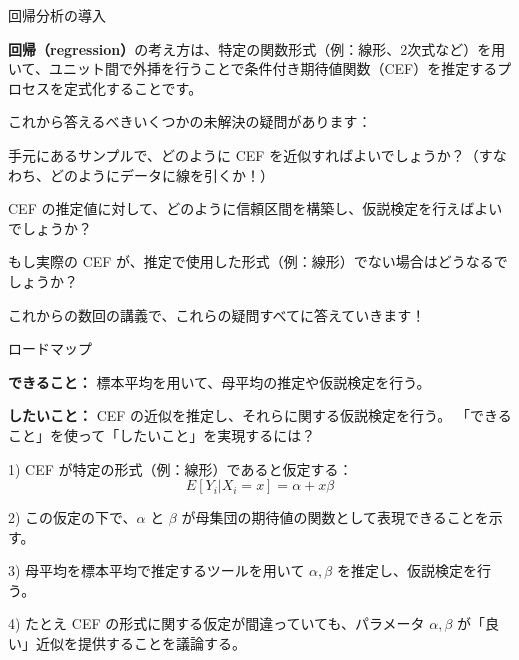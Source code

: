 \documentclass[11pt,handout]{beamer}
\newenvironment{wideitemize}{\itemize\addtolength{\itemsep}{10pt}}{\enditemize}
\begin{document}
\begin{frame}{回帰分析の導入}
\begin{wideitemize}

\item
\textbf{回帰（regression）}の考え方は、特定の関数形式（例：線形、2次式など）を用いて、ユニット間で外挿を行うことで条件付き期待値関数（CEF）を推定するプロセスを定式化することです。

\pause
\item
これから答えるべきいくつかの未解決の疑問があります：

\pause
\item
手元にあるサンプルで、どのように CEF を近似すればよいでしょうか？（すなわち、どのようにデータに線を引くか！）

\pause
\item
CEF の推定値に対して、どのように信頼区間を構築し、仮説検定を行えばよいでしょうか？

\pause
\item
もし実際の CEF が、推定で使用した形式（例：線形）でない場合はどうなるでしょうか？

\pause
\item
これからの数回の講義で、これらの疑問すべてに答えていきます！

\end{wideitemize}	
\end{frame}	


\begin{frame}{ロードマップ}
\vspace{0.2cm}
\begin{wideitemize}
\item \textbf{できること：} 標本平均を用いて、母平均の推定や仮説検定を行う。
\item \textbf{したいこと：} CEF の近似を推定し、それらに関する仮説検定を行う。
\end{wideitemize}
\pause
\bigskip
「できること」を使って「したいこと」を実現するには？
\pause
\begin{wideitemize}
	\item 1) CEF が特定の形式（例：線形）であると仮定する：
	$$E[Y_i | X_i = x] = \alpha + x \beta$$
	
	\pause
	\item 2) この仮定の下で、$\alpha$ と $\beta$ が母集団の期待値の関数として表現できることを示す。
	
	\pause
	\item
	3) 母平均を標本平均で推定するツールを用いて $\alpha, \beta$ を推定し、仮説検定を行う。
	
	\pause
	\item
	4) たとえ CEF の形式に関する仮定が間違っていても、パラメータ $\alpha, \beta$ が「良い」近似を提供することを議論する。
\end{wideitemize}

\end{frame}
\end{document}

